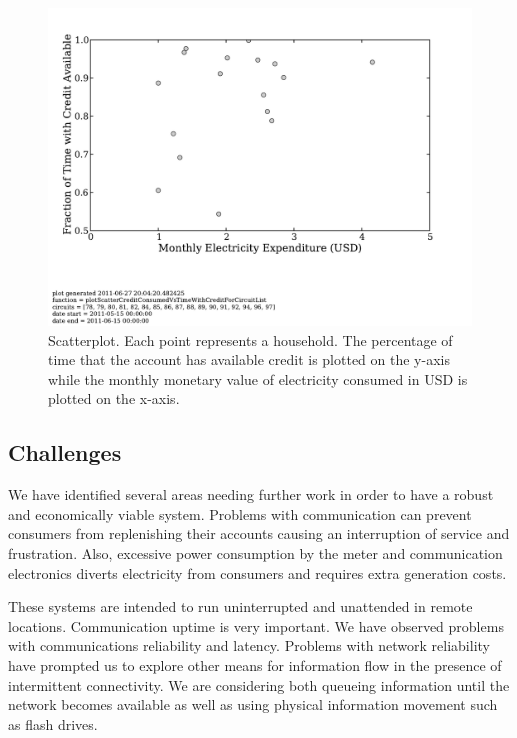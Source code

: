\documentclass{sig-alternate}
\newcommand{\note}[1]{{\color{red} NOTE: *** #1 ***}}
\begin{document}
\begin{figure}[]
\begin{center}
\includegraphics[trim = 0in 1.3in 0in 0in, clip, width=\columnwidth]
                {figures/scatterCreditTime.pdf}
\end{center}
\caption{Scatterplot.  Each point represents a household.  The percentage
of time that the account has available credit is plotted on the y-axis while
the monthly monetary value of electricity consumed in USD is plotted on the x-axis.}
\label{scatterCreditTime}
\end{figure}


\subsection{Challenges}
We have identified several areas needing further work in order to have
a robust and economically viable system.  Problems with communication
can prevent consumers from replenishing their accounts causing 
an interruption of service and frustration.  Also, excessive
power consumption by the meter and communication electronics diverts
electricity from consumers and requires extra generation costs.

These systems are intended to run uninterrupted and unattended in
remote locations.  Communication uptime is very important.  We have
observed problems with communications reliability and latency.
Problems with network reliability have prompted us to explore other
means for information flow in the presence of intermittent connectivity.
We are considering both queueing information until the network becomes
available as well as using physical information movement such as flash
drives.
\end{document}
